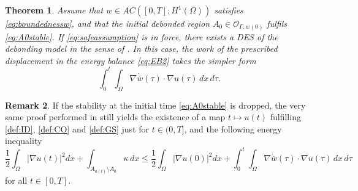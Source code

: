 \documentclass[a4paper,11pt,reqno]{amsart}
\numberwithin{equation}{section}
\newtheorem{teo}{Theorem}[section]
\theoremstyle{definition}
\newtheorem{remark}[teo]{Remark}
\theoremstyle{remark}
\begin{document}
\begin{teo}\label{thm:safe}
    Assume that $w\in AC([0,T];H^1(\Omega))$ satisfies \eqref{eq:boundednessw}, and that the initial debonded region $A_0\in \mathcal O_{\Gamma,w(0)}$ fulfils \eqref{eq:A0stable}. If \eqref{eq:safeassumption} is in force, there exists a DES of the debonding model in the sense of . In this case, the work of the prescribed displacement in the energy balance \eqref{eq:EB2} takes the simpler form
        \begin{equation}
        \int_0^t  \int_\Omega \nabla \dot{\overline w}(\tau)\cdot \nabla u(\tau) \, dx\, d\tau.
    \end{equation}
\end{teo}
\begin{remark}\label{rmk:nostable}
    If the stability at the initial time \eqref{eq:A0stable} is dropped, the very same proof performed in  still yields the existence of a map $t\mapsto u(t)$ fulfilling \ref{def:ID}, \ref{def:CO} and \ref{def:GS} just for $t\in (0,T]$, and the following energy inequality
    \begin{equation}
        \frac 12 \int_\Omega |\nabla u(t)|^2 dx+\int_{A_{u(t)}\setminus A_0}\kappa\,d x\le   \frac 12 \int_\Omega |\nabla u(0)|^2 dx+\int_0^t  \int_\Omega \nabla \dot{\overline w}(\tau)\cdot \nabla u(\tau) \, dx\, d\tau
    \end{equation}
    for all $t\in [0,T]$.
\end{remark}
\end{document}
